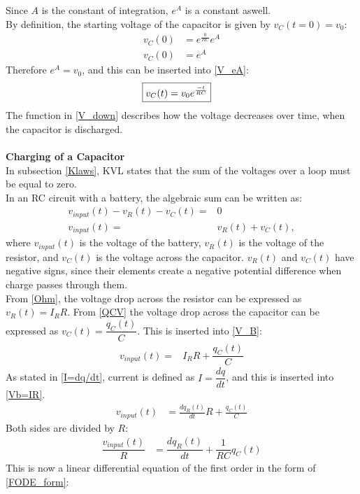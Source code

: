 Since $A$ is the constant of integration, $e^A$ is a constant aswell.
\\
By definition, the starting voltage of the capacitor is given by $v_C(t=0)=v_0$:
 \begin{align*}
	v_C(0) &= e^{\frac{0}{RC}}e^A\\
	v_C(0) &= e^A
 \end{align*}
Therefore $e^A = v_0$, and this can be inserted into \eqref{V_eA}:
\begin{align}
\label{V_down}
\Aboxed{
 v_C(t) = v_0e^{\frac{-t}{RC}}
 }
\end{align}
The function in \eqref{V_down} describes how the voltage decreases over time, when the capacitor is discharged.
\\
\\
\textbf{Charging of a Capacitor}\\
In subsection \ref{Klaws}, KVL states that the sum of the voltages over a loop must be equal to zero. 
\\
In an RC circuit with a battery, the algebraic sum can be written as:
\begin{align}
v_{input}(t)-v_R(t)-v_C(t) =& 0 \nonumber \\
v_{input}(t) =& v_R(t)+v_C(t), \label{V_B}
\end{align}
where $v_{input}(t)$ is the voltage of the battery, $v_R(t)$ is the voltage of the resistor, and $v_C(t)$ is the voltage across the capacitor. $v_R(t)$ and $v_C(t)$ have negative signs, since their elements create a negative potential difference when charge passes through them.
\\
From \eqref{Ohm}, the voltage drop across the resistor can be expressed as $v_R(t)=I_R R$. From \eqref{QCV} the voltage drop across the capacitor can be expressed as $v_C(t)=\dfrac{q_C (t)}{C}$. This is inserted into \eqref{V_B}:
\begin{align}
v_{input}(t) =& I_R R + \dfrac{q_C (t)}{C} \label{Vb=IR}
\end{align}
As stated in \eqref{I=dq/dt}, current is defined as $I =\dfrac{dq}{dt}$, and this is inserted into \eqref{Vb=IR}.
 \begin{align*}
 	v_{input}(t) &= \frac{dq_R(t)}{dt} R + \frac{q_C (t)}{C}
 \end{align*}
Both sides are divided by $R$:
\begin{align}
\dfrac{v_{input}(t)}{R} &= \dfrac{dq_R(t)}{dt} + \dfrac{1}{RC}q_C(t)\label{Vb/R} 
\end{align}
This is now a linear differential equation of the first order in the form of \eqref{FODE_form}:
